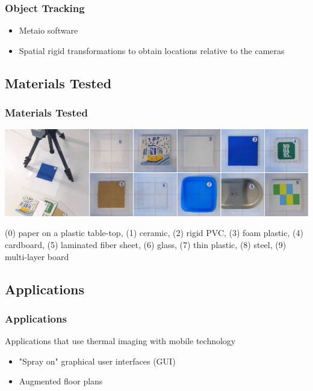 \documentclass{beamer}
\begin{document}
\begin{frame}	
\frametitle{Object Tracking}
\begin{itemize}
	\item Metaio software
	\item Spatial rigid transformations to obtain locations relative to the cameras 
\end{itemize}
\end{frame}

\subsection{Materials Tested}
\begin{frame}	
\frametitle{Materials Tested}
\includegraphics[width=\textwidth]{../Sample_paper/images/ThermalTesting}

(0) paper on a plastic table-top, (1) ceramic, (2) rigid PVC, (3) foam plastic, (4) cardboard, (5) laminated fiber sheet, (6) glass, (7) thin plastic, (8) steel, (9) multi-layer board
\end{frame}



\subsection{Applications}

\begin{frame}
	\frametitle{Applications}
	Applications that use thermal imaging with mobile technology 
	\begin{itemize}
		\item "Spray on" graphical user interfaces (GUI)
		\item Augmented floor plans
	\end{itemize}
\end{frame}
\end{document}
